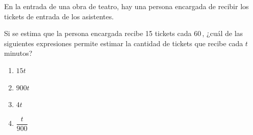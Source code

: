 \begin{problem}
    En la entrada de una obra de teatro, hay una persona encargada de recibir los tickets de entrada de los asistentes.

    Si se estima que la persona encargada recibe 15 tickets cada 60\,, ¿cuál de las siguientes expresiones permite estimar la cantidad de tickets que recibe cada $t$ minutos?

    \begin{enumerate}[label=\Alph*.]
        \item $15t$
        \item $900t$
        \item $4t$
        \item $\dfrac{t}{900}$
    \end{enumerate}
\end{problem}
